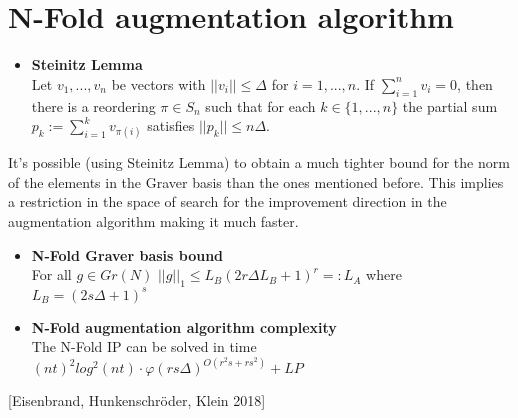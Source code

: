 \chapter{N-Fold augmentation algorithm} \label{framework}



\begin{itemize}
        \item \textbf{Steinitz Lemma}\\
            Let $v_1,...,v_n$ be vectors with $||v_i|| \leq \Delta$ for $i = 1,...,n$. If $\sum_{i=1}^{n} v_i = 0$, then there is a reordering $\pi \in S_n$ such that for each $k \in \{1,...,n\}$ the partial sum $p_k := \sum_{i=1}^{k}v_{\pi(i)}$ satisfies $||p_k|| \leq n\Delta$.
\end{itemize}

It's possible (using Steinitz Lemma) to obtain a much tighter bound for the norm of the elements in the Graver basis than the ones mentioned before. This implies a restriction in the space of search for the improvement direction in the augmentation algorithm making it much faster.

\begin{itemize}
        \item \textbf{N-Fold Graver basis bound}\\
            For all $g \in Gr(N)$ $||g||_1 \leq L_B (2r\Delta L_B + 1)^r =: L_A$ where $L_B = (2s \Delta + 1)^s$
        \item \textbf{N-Fold augmentation algorithm complexity}\\
            The N-Fold IP can be solved in time $(nt)^2 log^2(nt) \cdot \varphi (rs\Delta)^{O(r^2s + rs^2)} + LP$
\end{itemize}
\hspace{15pt} [Eisenbrand, Hunkenschröder, Klein 2018]
        
        
